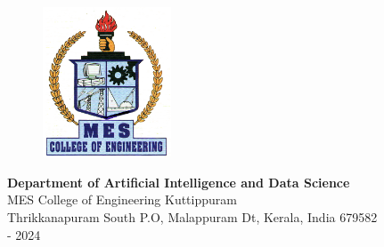 \begin{titlepage}
	

		\vspace{0.1cm}
\begin{figure}[h]
            \centering
            \includegraphics[width=1.5in]{Logo.png}\\
            
\end{figure}

			\begin{center}
				\begin{singlespace}
						\textbf{\fontsize{14}{12}\selectfont Department of Artificial Intelligence and Data Science}\\
						\hspace{}
						 MES College of Engineering Kuttippuram \\%
						 Thrikkanapuram South P.O, Malappuram Dt, Kerala, India 679582 \\%
						\vspace{12pt}
						 \fontsize{14}{12} - 2024
				\end{singlespace}
			\end{center}
	\vspace{-.5cm}
\setcounter{page}{0}
\pagebreak
\end{titlepage}
